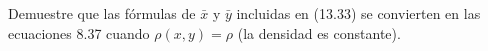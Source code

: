 \item Demuestre que las fórmulas de $\bar{x}$ y $\bar{y}$ incluidas en (13.33) se convierten en las ecuaciones 8.37 cuando $\rho(x, y) = \rho$ (la densidad es constante).
